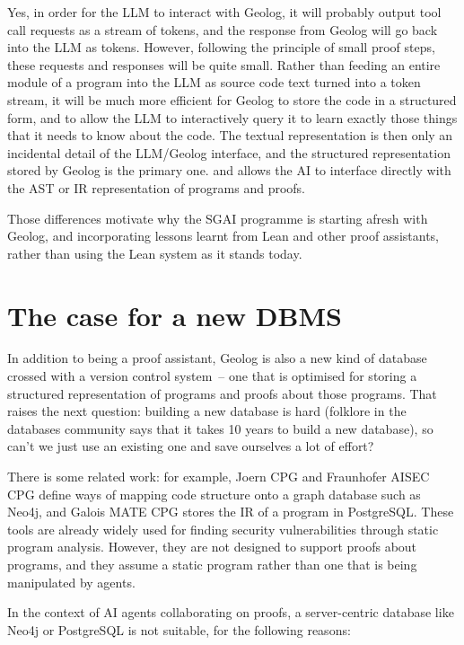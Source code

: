 \documentclass{article}
\begin{document}
\begin{itemize}
{        Yes, in order for the LLM to interact with Geolog, it will probably output tool call requests as a stream of tokens, and the response from Geolog will go back into the LLM as tokens.
        However, following the principle of small proof steps, these requests and responses will be quite small.
        Rather than feeding an entire module of a program into the LLM as source code text turned into a token stream, it will be much more efficient for Geolog to store the code in a structured form, and to allow the LLM to interactively query it to learn exactly those things that it needs to know about the code.
        The textual representation is then only an incidental detail of the LLM/Geolog interface, and the structured representation stored by Geolog is the primary one.} and allows the AI to interface directly with the AST or IR representation of programs and proofs.
\end{itemize}

Those differences motivate why the SGAI programme is starting afresh with Geolog, and incorporating lessons learnt from Lean and other proof assistants, rather than using the Lean system as it stands today.

\section{The case for a new DBMS}

In addition to being a proof assistant, Geolog is also a new kind of database crossed with a version control system~-- one that is optimised for storing a structured representation of programs and proofs about those programs.
That raises the next question: building a new database is hard (folklore in the databases community says that it takes 10 years to build a new database), so can't we just use an existing one and save ourselves a lot of effort?

There is some related work: for example, Joern CPG \citep{joern-cpg} and Fraunhofer AISEC CPG \citep{fraunhofer-cpg} define ways of mapping code structure onto a graph database such as Neo4j, and Galois MATE CPG \citep{galois-cpg} stores the IR of a program in PostgreSQL.
These tools are already widely used for finding security vulnerabilities through static program analysis.
However, they are not designed to support proofs about programs, and they assume a static program rather than one that is being manipulated by agents.

In the context of AI agents collaborating on proofs, a server-centric database like Neo4j or PostgreSQL is not suitable, for the following reasons:
\end{document}
